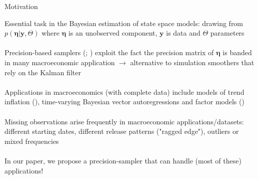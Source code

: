 \documentclass[xcolor=svgnames, 10pt, aspectratio=169]{beamer}
\begin{document}
\begin{frame}{Motivation}

Essential task in the Bayesian estimation of state space models: drawing from $p(\boldsymbol{\eta} | \mathbf{y}, \Theta)$ where $\boldsymbol{\eta}$ is an unobserved component, $\mathbf{y}$ is data and $\Theta$ parameters \\~\\

Precision-based samplers (\citealp[][\scriptsize \textbf{IJMMNO}\normalsize]{chanjelizakov_2009}; \citealp[][\scriptsize \textbf{JEcmtrics}\normalsize]{mccausland_2012}) exploit the fact the precision matrix of $\boldsymbol{\eta}$ is banded in many macroeconomic application $\rightarrow$ alternative to simulation smoothers that rely on the Kalman filter \\~\\

Applications in macroeconomics (with complete data) include models of trend inflation (\citealp[][\scriptsize \textbf{JBES}\normalsize]{chankooppotter_jae2013}), time-varying Bayesian vector autoregressions \citep[][\scriptsize \textbf{JBES}\normalsize]{chan_2020jbes} and factor models (\citealp[][\scriptsize \textbf{JAE}\normalsize]{kaufmannschumacher_jae2017})\\~\\

Missing observations arise frequently in macroeconomic applications/datasets: different starting dates, different release patterns ("ragged edge"), outliers or mixed frequencies\\~\\

In our paper, we propose a precision-sampler that can handle (most of these) applications! 

\end{frame}
\end{document}
